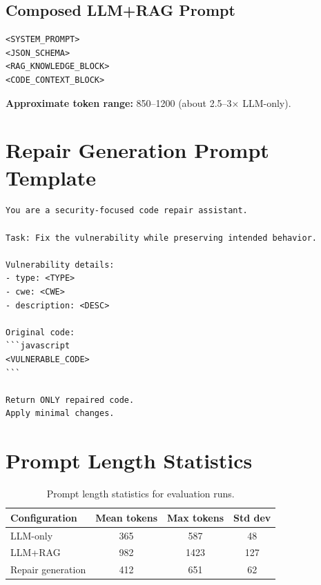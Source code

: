 \subsection{Composed LLM+RAG Prompt}
\begin{lstlisting}[basicstyle=\footnotesize\ttfamily, breaklines=true, frame=single, caption={Composed LLM+RAG prompt}, label={lst:complete-rag-prompt}]
<SYSTEM_PROMPT>
<JSON_SCHEMA>
<RAG_KNOWLEDGE_BLOCK>
<CODE_CONTEXT_BLOCK>
\end{lstlisting}

\textbf{Approximate token range:} 850--1200 (about 2.5--3$\times$ LLM-only).

\section{Repair Generation Prompt Template}
\label{sec:prompt-repair}

\begin{lstlisting}[basicstyle=\small\ttfamily, breaklines=true, frame=single, caption={Repair generation prompt}, label={lst:repair-prompt}]
You are a security-focused code repair assistant.

Task: Fix the vulnerability while preserving intended behavior.

Vulnerability details:
- type: <TYPE>
- cwe: <CWE>
- description: <DESC>

Original code:
```javascript
<VULNERABLE_CODE>
```

Return ONLY repaired code.
Apply minimal changes.
\end{lstlisting}

\section{Prompt Length Statistics}

\begin{table}[H]
  \centering
  \caption{Prompt length statistics for evaluation runs.}
  \label{tab:prompt-length-stats}
  \small
  \begin{tabular}{lccc}
    \toprule
    Configuration & Mean tokens & Max tokens & Std dev \\
    \midrule
    LLM-only & 365 & 587 & 48 \\
    LLM+RAG & 982 & 1423 & 127 \\
    Repair generation & 412 & 651 & 62 \\
    \bottomrule
  \end{tabular}
\end{table}

